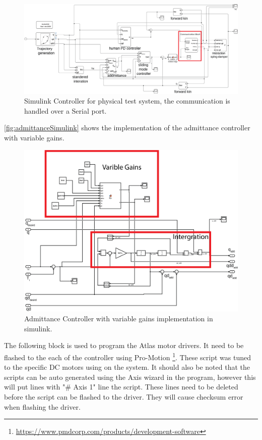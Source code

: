  \begin{figure}[h]
     \centering
     \includegraphics[width=\textwidth]{images/appendix/phyical_system_simulink.png}
     \caption[Simulink Controller]{Simulink Controller for physical test system, the communication is handled over a Serial port.}
     \label{fig:PhyicalModelSimulink}
\end{figure}


 \autoref{fig:admittanceSimulink} shows the implementation of the admittance controller with variable gains. 
 
\begin{figure}[h]
     \centering
     \includegraphics[width=\textwidth]{images/appendix/addmittance_simulink.png}
     \caption[Simulink Admittance Controller]{Admittance Controller with variable gains implementation in simulink.}
    \label{fig:admittanceSimulink}
\end{figure}

The following block is used to program the Atlas motor drivers. It need to be flashed to the each of the controller using Pro-Motion \footnote{\href{https://www.pmdcorp.com/products/development-software}{https://www.pmdcorp.com/products/development-software}}. These script was tuned to the specific DC motors using on the system. It should also be noted that the scripts can be auto generated using the Axis wizard in the program, however this will put lines with "\# Axis 1" line the script. These lines need to be deleted before the script can be flashed to the driver. They will cause checksum error when flashing the driver.   

